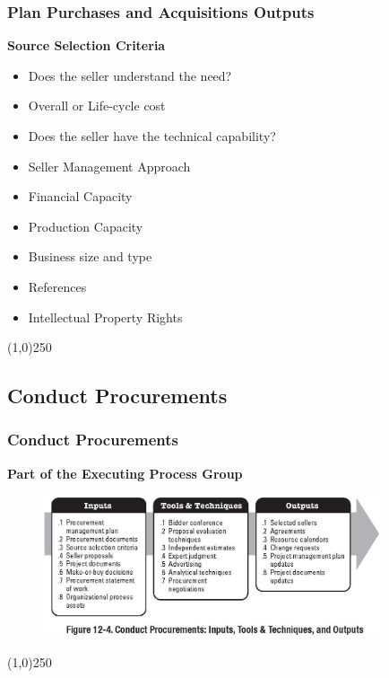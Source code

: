 \begin{frame}
\frametitle{Plan Purchases and Acquisitions \hfill\hfill Outputs}
\textbf{Source Selection Criteria}
	\begin{itemize}
		\item Does the seller understand the need?
		\item Overall or Life-cycle cost
		\item Does the seller have the technical capability?
		\item Seller Management Approach
		\item Financial Capacity
		\item Production Capacity
		\item Business size and type
		\item References
		\item Intellectual Property Rights
	\end{itemize}
\end{frame}\begin{center}\line(1,0){250}\end{center}


\subsection{Conduct Procurements}


\begin{frame}
\frametitle{Conduct Procurements}
\textbf{Part of the Executing Process Group}
\begin{figure}
	\centering
		\includegraphics[width = 10cm]{images/Fig12-4.jpg}
	\label{fig:12-4}
\end{figure}
\end{frame}\begin{center}\line(1,0){250}\end{center}




